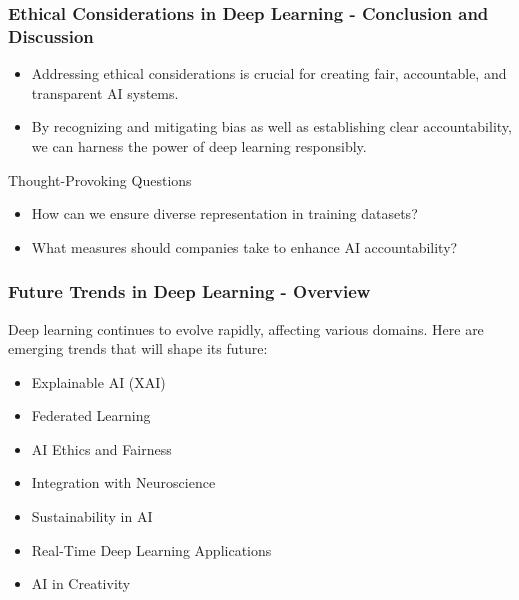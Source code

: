\documentclass[aspectratio=169]{beamer}
\begin{document}
\begin{frame}[fragile]
  \frametitle{Ethical Considerations in Deep Learning - Conclusion and Discussion}
  \begin{itemize}
    \item Addressing ethical considerations is crucial for creating fair, accountable, and transparent AI systems.
    \item By recognizing and mitigating bias as well as establishing clear accountability, we can harness the power of deep learning responsibly.
  \end{itemize}

  \begin{block}{Thought-Provoking Questions}
    \begin{itemize}
      \item How can we ensure diverse representation in training datasets?
      \item What measures should companies take to enhance AI accountability?
    \end{itemize}
  \end{block}
\end{frame}

\begin{frame}[fragile]
    \frametitle{Future Trends in Deep Learning - Overview}
    Deep learning continues to evolve rapidly, affecting various domains. Here are emerging trends that will shape its future:
    \begin{itemize}
        \item Explainable AI (XAI)
        \item Federated Learning
        \item AI Ethics and Fairness
        \item Integration with Neuroscience
        \item Sustainability in AI
        \item Real-Time Deep Learning Applications
        \item AI in Creativity
    \end{itemize}
\end{frame}
\end{document}
